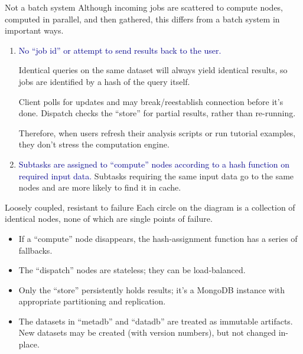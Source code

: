 \documentclass{beamer}
\begin{document}
\begin{frame}{Not a batch system}
\vspace{0.5 cm}
Although incoming jobs are scattered to compute nodes, computed in parallel, and then gathered, this differs from a batch system in important ways.

\begin{enumerate}
\item \textcolor{darkblue}{No ``job id'' or attempt to send results back to the user.}

\vspace{0.1 cm}
Identical queries on the same dataset will always yield identical results, so jobs are identified by a hash of the query itself.

\vspace{0.1 cm}
Client polls for updates and may break/reestablish connection before it's done. Dispatch checks the ``store'' for partial results, rather than re-running.

\vspace{0.1 cm}
Therefore, when users refresh their analysis scripts or run tutorial examples, they don't stress the computation engine.

\item \textcolor{darkblue}{Subtasks are assigned to ``compute'' nodes according to a hash function on required input data.} Subtasks requiring the same input data go to the same nodes and are more likely to find it in cache.
\end{enumerate}
\end{frame}

\begin{frame}{Loosely coupled, resistant to failure}
Each circle on the diagram is a collection of identical nodes, none of which are single points of failure.

\begin{itemize}
\item If a ``compute'' node disappears, the hash-assignment function has a series of fallbacks.
\item The ``dispatch'' nodes are stateless; they can be load-balanced.
\item Only the ``store'' persistently holds results; it's a MongoDB instance with appropriate partitioning and replication.
\item The datasets in ``metadb'' and ``datadb'' are treated as immutable artifacts. New datasets may be created (with version numbers), but not changed in-place.
\end{itemize}
\end{frame}
\end{document}
